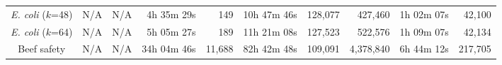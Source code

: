 \begin{mytable}
\begin{tabular}{@{}crrrrrrrrr@{}}
    \emph{E. coli} ($k$=48)         & N/A & N/A & 4h 35m 29s & 149 & 10h 47m 46s & 128,077 & 427,460 & 1h 02m 07s & 42,100 \\


    \emph{E. coli} ($k$=64)         & N/A & N/A & 5h 05m 27s & 189 & 11h 21m 08s & 127,523 & 522,576 & 1h 09m 07s & 42,134 \\

    Beef safety & N/A & N/A & 34h 04m 46s & 11,688 & 82h 42m 48s & 109,091 & 4,378,840 & 6h 44m 12s & 217,705 \\


\end{tabular}
\end{mytable}
